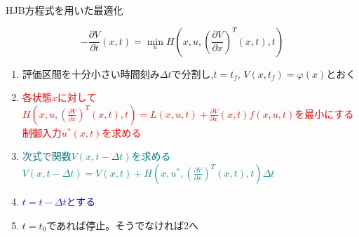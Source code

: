 \documentclass[twocolumn, dvipdfmx,12pt]{beamer}
\begin{document}
    \begin{frame}{HJB方程式を用いた最適化}
        \fontsize{11.8pt}{8.8pt}\selectfont

        \begin{screen}
            \begin{equation*}
                -\frac{\partial V}{\partial t}\left(x,t\right) = \min _u H\left(x, u, \left( \frac{\partial V}{\partial x} \right)^T\left(x, t\right), t \right)
            \end{equation*}
        \end{screen}
        
        \begin{enumerate}
            \item 評価区間を十分小さい時間刻み$\Delta t$で分割し,$t=t_f$, $V(x, t_f)=\varphi (x)$とおく
            \item \textcolor{red}{各状態$x$に対して$H\left(x, u, \left( \frac{\partial V}{\partial x} \right)^T\left(x, t\right), t \right) = L(x, u, t) + \frac{\partial V}{\partial x}\left(x, t\right)f\left(x, u, t\right)$を最小にする制御入力$u^*(x, t)$を求める}
            \item \textcolor{teal}{次式で関数$V(x, t-\Delta t)$を求める$V(x, t-\Delta t)=V(x, t)+H\left(x, u^*, \left( \frac{\partial V}{\partial x} \right)^T\left(x, t\right), t \right)\Delta t$}
            \item \textcolor{blue}{$t=t-\Delta t$とする}
            \item $t=t_0$であれば停止。そうでなければ2へ
        \end{enumerate}
    \end{frame}
\end{document}
